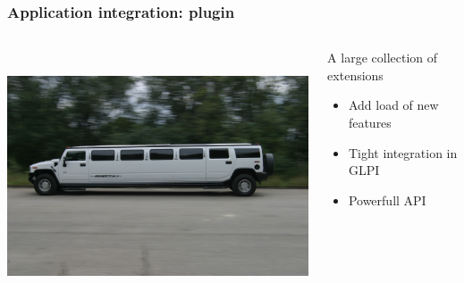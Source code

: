 \documentclass{beamer}
\begin{document}
\begin{frame}

    \frametitle{Application integration: plugin}

 \begin{columns}
 \begin{column}{0.45\textwidth}
         \includegraphics[height=7.5cm]{./pics/plugin.jpg}
 \end{column}
 \begin{column}{0.65\textwidth}
    \begin{block}{A large collection of \\
    extensions}
        \begin{itemize}
            \item Add load of new features
            \item Tight integration in GLPI
            \item Powerfull API
        \end{itemize}
    \end{block}

 \end{column}
\end{columns}





\end{frame}
\end{document}
